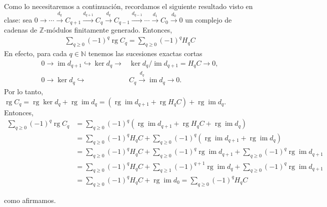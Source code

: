 \documentclass[11pt]{article}
\newcommand{\N}{\mathbb{N}}
\newcommand{\Z}{\mathbb{Z}}
\newcommand{\rg}{\operatorname{rg}}
\newcommand{\im}{\operatorname{im}}
\newcommand{\paint}[1]{\color{color}{#1}}
\newenvironment{obs}[2][Observaci\'on]{\begin{trivlist}
\item[\hskip \labelsep \paint{{\bfseries #1}}\hskip \labelsep {\bfseries #2.}]}{\end{trivlist}}
\begin{document}
\begin{obs}{3} Como lo necesitaremos a continuaci\'on, recordamos el siguiente resultado visto en clase: sea $0 \to \cdots \xrightarrow{d_{q}} C_{q+1} \xrightarrow{d_{q+1}} C_q \xrightarrow{d_{q}} C_{q-1} \xrightarrow{d_{q-1}} \cdots \xrightarrow{d_{1}} C_0 \xrightarrow{d_0} 0$ un complejo de cadenas de $\Z$-m\'odulos finitamente generado. Entonces,
\begin{align*}
\sum_{q \geq 0}(-1)^q\rg C_q = \sum_{q \geq 0}(-1)^qH_qC
\end{align*}
En efecto, para cada $q \in \N$ tenemos las sucesiones exactas cortas
\begin{align*}
0 \to \im d_{q+1} \hookrightarrow \ker d_q \to &\ker d_q/\im d_{q+1} = H_qC \to 0, \\
0 \to \ker d_q \hookrightarrow &C_q \xrightarrow{d_q} \im d_q \to 0.
\end{align*}
Por lo tanto, $\rg C_q =  \rg \ker d_q + \rg \im d_q = (\rg \im d_{q+1} + \rg H_qC) + \rg \im d_q$. Entonces,
\begin{align*}
\sum_{q \geq 0}(-1)^q\rg C_q &= \sum_{q \geq 0}(-1)^q(\rg \im d_{q+1} + \rg H_qC + \rg \im d_q)\\
&= \sum_{q \geq 0}(-1)^qH_qC + \sum_{q \geq 0}(-1)^q(\rg \im d_{q+1} + \rg \im d_q)\\
&= \sum_{q \geq 0}(-1)^qH_qC + \sum_{q \geq 0}(-1)^q\rg \im d_{q+1} + \sum_{q \geq 0}(-1)^q\rg \im d_{q+1}\\
&= \sum_{q \geq 0}(-1)^qH_qC + \sum_{q \geq 1}(-1)^{q+1}\rg \im d_{q} + \sum_{q \geq 0}(-1)^q\rg \im d_{q+1}\\
&= \sum_{q \geq 0}(-1)^qH_qC + \rg \im d_0 = \sum_{q \geq 0}(-1)^qH_qC
\end{align*} 
\end{obs}
como afirmamos.
\end{document}
